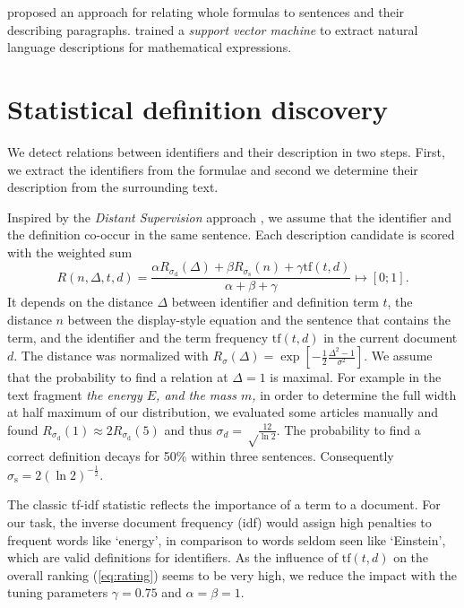 \documentclass[runningheads]{llncs}
\begin{document}
\citeauthor{Quoc2010} \cite{Quoc2010} proposed an approach for
relating whole formulas to sentences and their describing paragraphs.
\citeauthor{Yokoi} \cite{Yokoi} trained a \emph{support vector machine} to extract
natural language descriptions for mathematical expressions.


\section{Statistical definition discovery}

We detect relations between identifiers and their description in two steps.
First, we extract the identifiers from the formulae and
second we determine their description from the surrounding text.

Inspired by the \emph{Distant Supervision} approach \cite{Mintz2008},
we assume that the identifier and the definition co-occur in the same sentence.
Each description candidate is scored with the weighted sum
\begin{equation} \label{eq:rating}
R(n,\Delta,t,d)=\frac{\alpha{R}_{\sigma_\mathrm d}(\Delta)
+\beta{R}_{\sigma_\mathrm s}(n)
+\gamma\mathrm{tf}(t,d)}{\alpha+\beta+\gamma} \mapsto [0;1].
\end{equation}
It depends on the distance $\Delta$ between identifier and definition term $t$, the distance $n$ between the display-style equation and the sentence that contains the term, and the identifier and the term frequency $\mathrm{tf}(t,d)$ in the current document $d$.
The distance was normalized with $R_\sigma(\Delta)= \exp\left[-\frac{1}{2}\frac{\Delta^2-1}{\sigma^2}\right].$
We assume that the probability to find a relation at $\Delta=1$ is maximal.  For example in the 
text fragment \emph{the energy $E$, and the mass $m$,}  
in order to determine the full width at half maximum of our distribution, we evaluated some articles manually and found $R_{\sigma_\mathrm d}(1)\approx 2 R_{\sigma_\mathrm d}(5)$ and thus 
$\sigma_d=\sqrt\frac{12}{\ln 2}$.
The probability to find a correct definition decays for 50\% within three sentences.
Consequently  $\sigma_\mathrm s=2\left({\ln 2}\right)^{-\frac{1}{2}}$.

The classic tf-idf \cite{Salton86} statistic reflects the importance of a term to a document.
For our task, the inverse document frequency (idf) would assign high penalties to 
frequent words like `energy', in comparison to 
words seldom seen like `Einstein', which are valid definitions for identifiers.
As the influence of $\mathrm{tf}(t,d)$ on the overall ranking (\ref{eq:rating}) seems to be very high, we reduce the impact with the tuning parameters $\gamma=0.75$ and $\alpha = \beta = 1$.
\end{document}
